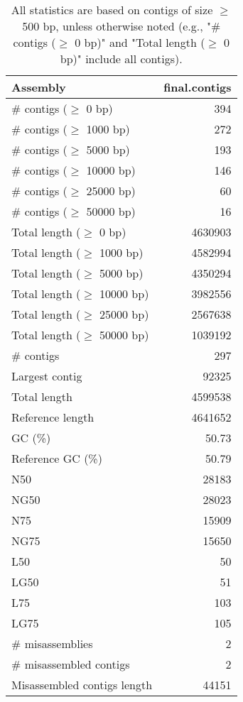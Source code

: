 \documentclass[12pt,a4paper]{article}
\begin{document}
\begin{table}[ht]
\begin{center}
\caption{All statistics are based on contigs of size $\geq$ 500 bp, unless otherwise noted (e.g., "\# contigs ($\geq$ 0 bp)" and "Total length ($\geq$ 0 bp)" include all contigs).}
\begin{tabular}{|l*{1}{|r}|}
\hline
Assembly & final.contigs \\ \hline
\# contigs ($\geq$ 0 bp) & 394 \\ \hline
\# contigs ($\geq$ 1000 bp) & 272 \\ \hline
\# contigs ($\geq$ 5000 bp) & 193 \\ \hline
\# contigs ($\geq$ 10000 bp) & 146 \\ \hline
\# contigs ($\geq$ 25000 bp) & 60 \\ \hline
\# contigs ($\geq$ 50000 bp) & 16 \\ \hline
Total length ($\geq$ 0 bp) & 4630903 \\ \hline
Total length ($\geq$ 1000 bp) & 4582994 \\ \hline
Total length ($\geq$ 5000 bp) & 4350294 \\ \hline
Total length ($\geq$ 10000 bp) & 3982556 \\ \hline
Total length ($\geq$ 25000 bp) & 2567638 \\ \hline
Total length ($\geq$ 50000 bp) & 1039192 \\ \hline
\# contigs & 297 \\ \hline
Largest contig & 92325 \\ \hline
Total length & 4599538 \\ \hline
Reference length & 4641652 \\ \hline
GC (\%) & 50.73 \\ \hline
Reference GC (\%) & 50.79 \\ \hline
N50 & 28183 \\ \hline
NG50 & 28023 \\ \hline
N75 & 15909 \\ \hline
NG75 & 15650 \\ \hline
L50 & 50 \\ \hline
LG50 & 51 \\ \hline
L75 & 103 \\ \hline
LG75 & 105 \\ \hline
\# misassemblies & 2 \\ \hline
\# misassembled contigs & 2 \\ \hline
Misassembled contigs length & 44151 \\ \hline

\end{tabular}
\end{center}
\end{table}
\end{document}

